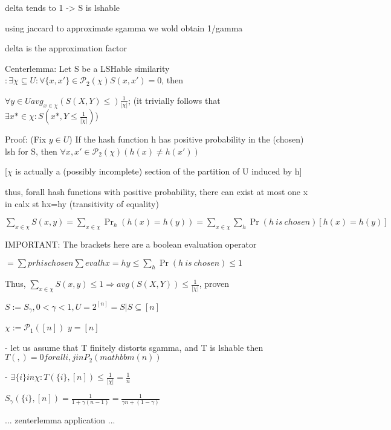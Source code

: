 \documentclass{report}
\begin{document}
	delta tends to 1 -> S is lshable
	
	using jaccard to approximate sgamma we wold obtain 1/gamma
	
	delta is the approximation factor
	
	
	Centerlemma: Let S be a LSHable similarity $ : \exists \chi \subseteq U : \forall \{x, x'\} \in \mathcal{P}_2(\chi) S(x, x')=0$, then
	
	$\forall y \in U avg_{x \in \chi}(S(X, Y) \leq) \frac{1}{|\chi|}$; (it trivially follows that $\exists x* \in \chi : S(x*, Y \leq \frac{1}{|\chi|})$)
	
	Proof: (Fix $y \in U$) If the hash function h has positive probability in the (chosen) lsh for S, then $\forall {x, x'} \in \mathcal{P}_2(\chi) (h(x)\neq h(x'))$
	
	[$\chi$ is actually a (possibly incomplete) section of the partition of U induced by h]
	
	thus, forall hash functions with positive probability, there can exist at most one x in calx st hx=hy (transitivity of equality)
	
	$\sum_{x \in \chi}S(x, y) = \sum_{x \in \chi}\Pr_h(h(x)=h(y)) = \sum_{x \in \chi}\sum_{h}\Pr(h\ is\ chosen)[h(x)=h(y)]$
	
	IMPORTANT: The brackets here are a boolean evaluation operator
	
	$= \sum pr h is chosen \sum eval hx = hy \leq \sum_h \Pr(h\ is\ chosen) \leq 1$
	
	Thus, $\sum_{x \in \chi}S(x, y) \leq 1 \Rightarrow avg(S(X, Y)) \leq \frac{1}{|\chi|}$, proven
	
	
	
	
	$S:= S_\gamma , 0 < \gamma < 1, U=2^{[n]}={S|S\subseteq [n]}$ %
	
	$\chi := \mathcal{P}_1([n])$
	$y = [n]$
	
	 - let us assume that T finitely distorts sgamma, and T is lshable
	then $T({},{}) = 0 forall {i, j} in P_2(mathbbm(n))$
	
	 - $\exists \{i\} in \chi : T(\{i\}, [n]) \leq \frac{1}{|\chi|} = \frac{1}{n}$
	 
	 $S_\gamma(\{i\}, [n]) = \frac{1}{1 + \gamma(n-1)} = \frac{1}{\gamma n + (1-\gamma)}$
	 
	 ...
	 zenterlemma application
	 ...
	
	
	
\end{document}
